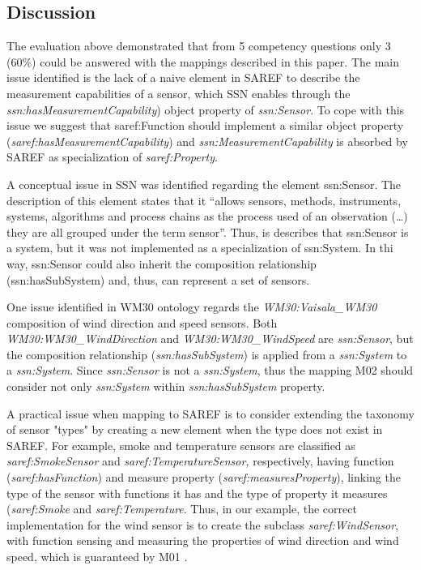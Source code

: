 \documentclass{sig-alternate-05-2015}
\begin{document}
\subsection{Discussion}

The evaluation above demonstrated that from 5 competency questions only 3 (60\%) could be answered with the mappings described in this paper. The main issue identified is the lack of a naive element in SAREF to describe the measurement capabilities  of a sensor, which SSN enables through the \textit{ssn:hasMeasurementCapability}) object property of \textit{ssn:Sensor}. To cope with this issue we suggest that saref:Function should implement a similar object property (\textit{saref:hasMeasurementCapability}) and \textit{ssn:MeasurementCapability} is absorbed by SAREF as specialization of \textit{saref:Property}. 

A conceptual issue in SSN was identified regarding the element ssn:Sensor. The description of this element states that it “allows sensors, methods, instruments, systems, algorithms and process chains as the process used of an observation (…) they are all grouped under the term sensor”. Thus, is describes that ssn:Sensor is a system, but it was not implemented as a specialization of ssn:System. In thi way, ssn:Sensor could also inherit the composition relationship (ssn:hasSubSystem) and, thus, can represent a set of sensors. 

One issue identified in WM30 ontology regards the \textit{WM30:Vaisala\_WM30} composition of wind direction and speed sensors. Both \textit{WM30:WM30\_WindDirection} and \textit{WM30:WM30\_WindSpeed} are \textit{ssn:Sensor}, but the composition relationship (\textit{ssn:hasSubSystem}) is applied from a \textit{ssn:System} to a \textit{ssn:System}. Since \textit{ssn:Sensor} is not a \textit{ssn:System}, thus the mapping M02 should consider not only \textit{ssn:System} within \textit{ssn:hasSubSystem} property. 

A practical issue when mapping to SAREF is to consider extending the taxonomy of sensor "types" by creating a new element when the type does not exist in SAREF. For example, smoke and temperature sensors are classified as \textit{saref:SmokeSensor} and \textit{saref:TemperatureSensor,} respectively, having  function (\textit{saref:hasFunction}) and measure property (\textit{saref:measuresProperty}), linking the type of the sensor with functions it has and the type of property it measures (\textit{saref:Smoke} and \textit{saref:Temperature}. Thus, in our example, the correct implementation for the wind sensor is to create the subclass \textit{saref:WindSensor}, with function sensing and measuring the properties of wind direction and wind speed, which is guaranteed by M01 \cite{bowman:reasoning,
clark:pct, braams:babel, herlihy:methodology}. 
\end{document}
